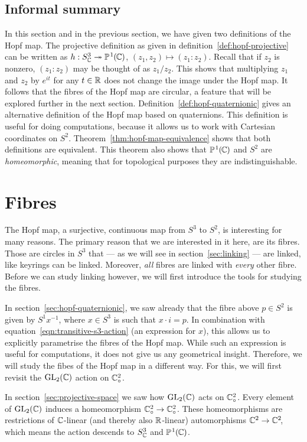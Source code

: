 \subsection*{Informal summary}
In this section and in the previous section,
we have given two definitions of the Hopf map.
The projective definition as given in definition~\ref{def:hopf-projective}
can be written as $h : S^3_{\mathbb{C}} \twoheadrightarrow \mathbb{P}^{\hspace{0.8pt}1}\hspace{-0.3pt}(\hspace{-0.7pt}\mathbb{C}\hspace{-0.3pt})$, $(z_1, z_2) \mapsto (z_1 : z_2)$.
Recall that if $z_2$ is nonzero, $(z_1 : z_2)$ may be thought of as $z_1 / z_2$.
This shows that multiplying $z_1$ and $z_2$ by $e^{it}$ for any $t \in \mathbb{R}$
does not change the image under the Hopf map.
It follows that the fibres of the Hopf map are circular,
a feature that will be explored further in the next section.
Definition~\ref{def:hopf-quaternionic} gives an alternative
definition of the Hopf map based on quaternions.
This definition is useful for doing computations,
because it allows us to work with Cartesian coordinates on $S^2\!$.
Theorem~\ref{thm:hopf-map-equivalence} shows that both definitions are equivalent.
This theorem also shows that $\mathbb{P}^{\hspace{0.8pt}1}\hspace{-0.3pt}(\hspace{-0.7pt}\mathbb{C}\hspace{-0.3pt})$ and $S^2$
are \emph{homeomorphic},
meaning that for topological purposes
they are indistinguishable.

\section{Fibres}
\label{sec:fibres}
The Hopf map,
a surjective, continuous map from $S^3$ to $S^2\!$,
is interesting for many reasons.
The primary reason that we are interested in it here,
are its fibres.
Those are circles in $S^3$ that — as we will see in section~\ref{sec:linking} —
are linked, like keyrings can be linked.
Moreover, \emph{all} fibres are linked with \emph{every} other fibre.
Before we can study linking however,
we will first introduce the tools for studying the fibres.

In section~\ref{sec:hopf-quaternionic},
we saw already that the fibre above $p \in S^2$
is given by $S^1 x^{-1}$,
where $x \in S^3$ is such that $x \cdot i = p$.
In combination with equation~\ref{eqn:transitive-s3-action}
(an expression for $x$),
this allows us to explicitly parametrise the fibres of the Hopf map.
While such an expression is useful for computations,
it does not give us any geometrical insight.
Therefore, we will study the fibes of the Hopf map in a different way.
For this,
we will first revisit the $\operatorname{GL}_2(\mathbb{C})$ action on $\mathbb{C}^2_\circ$.

In section~\ref{sec:projective-space} we saw how $\operatorname{GL}_2(\mathbb{C})$ acts on $\mathbb{C}^2_\circ$.
Every element of $\operatorname{GL}_2(\mathbb{C})$ induces a homeomorphism $\mathbb{C}^2_\circ \to \mathbb{C}^2_\circ$.
These homeomorphisms are restrictions
of $\mathbb{C}$-linear (and thereby also $\mathbb{R}$-linear) automorphisms $\mathbb{C}^2 \to \mathbb{C}^2\!$,
which means the action descends to $S^3_{\mathbb{C}}$ and $\mathbb{P}^{\hspace{0.8pt}1}\hspace{-0.3pt}(\hspace{-0.7pt}\mathbb{C}\hspace{-0.3pt})$.

